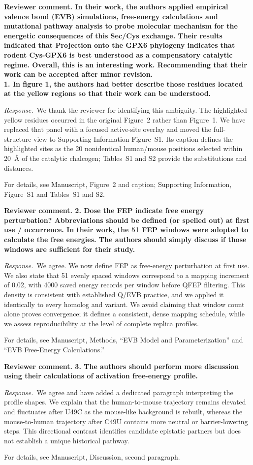 \documentclass[11pt]{article}
\newcommand{\ReviewerComment}[1]{\par\noindent\textbf{Reviewer comment. #1}\par}
\newcommand{\AuthorResponse}{\par\noindent\textit{Response.}\ }
\newcommand{\Location}[1]{\par\noindent For details, see #1\par}
\begin{document}
\ReviewerComment{In their work, the authors applied empirical valence bond (EVB) simulations, free-energy calculations and mutational pathway analysis to probe molecular mechanism for the energetic consequences of this Sec/Cys exchange. Their results indicated that Projection onto the GPX6 phylogeny indicates that rodent Cys-GPX6 is best understood as a compensatory catalytic regime. Overall, this is an interesting work. Recommending that their work can be accepted after minor revision.\\
1. In figure 1, the authors had better describe those residues located at the yellow regions so that their work can be understood.}

\AuthorResponse We thank the reviewer for identifying this ambiguity. The highlighted
yellow residues occurred in the original Figure~2 rather than Figure~1. We have replaced
that panel with a focused active-site overlay and moved the full-structure view to
Supporting Information Figure~S1. Its caption defines the highlighted sites as the 20
nonidentical human/mouse positions selected within 20~\AA{} of the catalytic chalcogen;
Tables~S1 and S2 provide the substitutions and distances.

\Location{Manuscript, Figure~2 and caption; Supporting Information, Figure~S1 and Tables~S1 and S2.}

\ReviewerComment{2. Dose the FEP indicate free energy perturbation? Abbreviations should be defined (or spelled out) at first use / occurrence. In their work, the 51 FEP windows were adopted to calculate the free energies. The authors should simply discuss if those windows are sufficient for their study.}

\AuthorResponse We agree. We now define FEP as free-energy perturbation at first use.
We also state that 51 evenly spaced windows correspond to a mapping increment of 0.02,
with 4000 saved energy records per window before QFEP filtering. This density is consistent
with established Q/EVB practice, and we applied it identically to every homolog and variant.
We avoid claiming that window count alone proves convergence; it defines a consistent,
dense mapping schedule, while we assess reproducibility at the level of complete
replica profiles.

\Location{Manuscript, Methods, ``EVB Model and Parameterization'' and ``EVB Free-Energy Calculations.''}

\ReviewerComment{3. The authors should perform more discussion using their calculations of activation free-energy profile.}

\AuthorResponse We agree and have added a dedicated paragraph interpreting the profile
shapes. We explain that the human-to-mouse trajectory remains
elevated and fluctuates after U49C as the mouse-like background is rebuilt, whereas the
mouse-to-human trajectory after C49U contains more neutral or barrier-lowering steps.
This directional contrast identifies candidate epistatic partners but does not establish
a unique historical pathway.

\Location{Manuscript, Discussion, second paragraph.}
\end{document}
